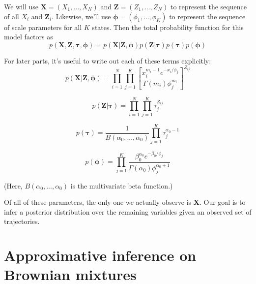 \documentclass{article}
\let\vec\boldsymbol
\begin{document}
We will use $\vec{X} = \left( X_{1}, ..., X_{N} \right)$ and
$\vec{Z} = \left( Z_{1}, ..., Z_{N} \right)$ to represent the sequence of
all $X_{i}$ and $\vec{Z}_{i}$.
Likewise, we'll use $\boldsymbol{\phi} = (\phi_{1}, ..., \phi_{K})$ to represent the sequence of scale parameters for all $K$ states.
Then the total probability function for this model factors as
\[
    p \left( \vec{X}, \vec{Z}, \boldsymbol{\tau}, \boldsymbol{\phi} \right) = p \left( \vec{X} | \vec{Z}, \boldsymbol{\phi} \right) p \left( \vec{Z} | \boldsymbol{\tau} \right) p \left( \boldsymbol{\tau} \right) p \left( \boldsymbol{\phi} \right)
\]

For later parts, it's useful to write out each of these terms explicitly:
\begin{equation}\label{eq:eqA}
    p \left( \vec{X} | \vec{Z}, \boldsymbol{\phi} \right) = \prod\limits_{i=1}^{N} \prod\limits_{j=1}^{K} \left[
        \frac{ x_{i}^{m_{i}-1} e^{-x_{i} / \phi_{j}}}{\Gamma (m_{i}) \phi_{j}^{m_{i}}}
    \right]^{Z_{ij}}
\end{equation}

\begin{equation}\label{eq:eqB}
    p \left( \vec{Z} | \boldsymbol{\tau} \right) = \prod\limits_{i=1}^{N} \prod\limits_{j=1}^{K} \tau_{j}^{Z_{ij}}
\end{equation}

\begin{equation}\label{eq:eqC}
    p \left( \boldsymbol{\tau} \right) = \frac{1}{B(\alpha_{0}, ..., \alpha_{0})} \prod\limits_{j=1}^{K} \tau_{j}^{\alpha_{0} - 1}
\end{equation}

\begin{equation}\label{eq:eqD}
    p \left( \boldsymbol{\phi} \right) = \prod\limits_{j=1}^{K} \frac{\beta_{0}^{\alpha_{0}} e^{-\beta_{0} / \phi_{j}}}{\Gamma (\alpha_{0}) \phi_{j}^{\alpha_{0} + 1}}
\end{equation}

(Here, $B(\alpha_{0}, ..., \alpha_{0})$ is the multivariate beta function.) \newline

Of all of these parameters, the only one we actually observe is $\vec{X}$.
Our goal is to infer a posterior distribution over the remaining variables
given an observed set of trajectories.

\section{Approximative inference on Brownian mixtures}
\end{document}
